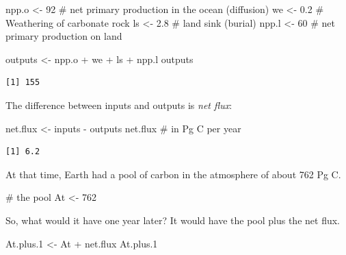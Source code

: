 \documentclass[
  letterpaper,
  DIV=11,
  numbers=noendperiod]{scrreprt}
\newenvironment{Shaded}{\begin{snugshade}}{\end{snugshade}}
\newcommand{\CommentTok}[1]{\textcolor[rgb]{0.37,0.37,0.37}{#1}}
\newcommand{\DecValTok}[1]{\textcolor[rgb]{0.68,0.00,0.00}{#1}}
\newcommand{\FloatTok}[1]{\textcolor[rgb]{0.68,0.00,0.00}{#1}}
\newcommand{\NormalTok}[1]{\textcolor[rgb]{0.00,0.23,0.31}{#1}}
\newcommand{\OtherTok}[1]{\textcolor[rgb]{0.00,0.23,0.31}{#1}}
\newcommand{\SpecialCharTok}[1]{\textcolor[rgb]{0.37,0.37,0.37}{#1}}
\begin{document}
\begin{Shaded}
\begin{Highlighting}[]
\NormalTok{npp.o }\OtherTok{\textless{}{-}} \DecValTok{92} \CommentTok{\# net primary production in the ocean (diffusion)}
\NormalTok{we }\OtherTok{\textless{}{-}} \FloatTok{0.2} \CommentTok{\# Weathering of carbonate rock}
\NormalTok{ls }\OtherTok{\textless{}{-}} \FloatTok{2.8} \CommentTok{\# land sink (burial)}
\NormalTok{npp.l }\OtherTok{\textless{}{-}} \DecValTok{60} \CommentTok{\# net primary production on land}

\NormalTok{outputs }\OtherTok{\textless{}{-}}\NormalTok{ npp.o }\SpecialCharTok{+}\NormalTok{ we }\SpecialCharTok{+}\NormalTok{ ls }\SpecialCharTok{+}\NormalTok{ npp.l}
\NormalTok{outputs}
\end{Highlighting}
\end{Shaded}

\begin{verbatim}
[1] 155
\end{verbatim}

The difference between inputs and outputs is \emph{net flux}:

\begin{Shaded}
\begin{Highlighting}[]
\NormalTok{net.flux }\OtherTok{\textless{}{-}}\NormalTok{ inputs }\SpecialCharTok{{-}}\NormalTok{ outputs}
\NormalTok{net.flux }\CommentTok{\# in Pg C per year}
\end{Highlighting}
\end{Shaded}

\begin{verbatim}
[1] 6.2
\end{verbatim}

At that time, Earth had a pool of carbon in the atmosphere of about 762
Pg C.

\begin{Shaded}
\begin{Highlighting}[]
\CommentTok{\# the pool}
\NormalTok{At }\OtherTok{\textless{}{-}} \DecValTok{762}
\end{Highlighting}
\end{Shaded}

So, what would it have one year later? It would have the pool plus the
net flux.

\begin{Shaded}
\begin{Highlighting}[]
\NormalTok{At.plus}\FloatTok{.1} \OtherTok{\textless{}{-}}\NormalTok{ At }\SpecialCharTok{+}\NormalTok{ net.flux}
\NormalTok{At.plus}\FloatTok{.1}
\end{Highlighting}
\end{Shaded}
\end{document}
